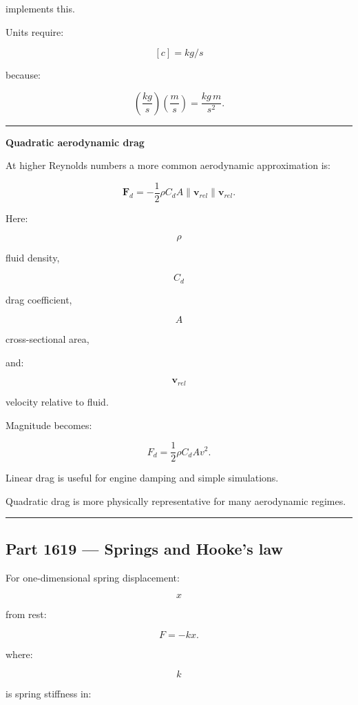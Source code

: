 implements this.

Units require:

\[
[c]
=
kg/s
\]

because:

\[
\left(\frac{kg}{s}\right)
\left(\frac{m}{s}\right)
=
\frac{kg\,m}{s^2}.
\]

\begin{center}\rule{0.5\linewidth}{0.5pt}\end{center}

\textbf{Quadratic aerodynamic drag}

At higher Reynolds numbers a more common aerodynamic approximation is:

\[
\boxed{
\mathbf{F}_d
=
-\frac12
\rho C_d A
\|\mathbf{v}_{rel}\|
\mathbf{v}_{rel}.
}
\]

Here:

\[
\rho
\]

fluid density,

\[
C_d
\]

drag coefficient,

\[
A
\]

cross-sectional area,

and:

\[
\mathbf{v}_{rel}
\]

velocity relative to fluid.

Magnitude becomes:

\[
F_d
=
\frac12\rho C_d A v^2.
\]

Linear drag is useful for engine damping and simple simulations.

Quadratic drag is more physically representative for many aerodynamic regimes.

\begin{center}\rule{0.5\linewidth}{0.5pt}\end{center}

\subsection{Part 1619 --- Springs and Hooke's law}\label{06-engine-ii-ch034-part-1619-springs-and-hookes-law}

For one-dimensional spring displacement:

\[
x
\]

from rest:

\[
\boxed{
F=-kx.
}
\]

where:

\[
k
\]

is spring stiffness in:

